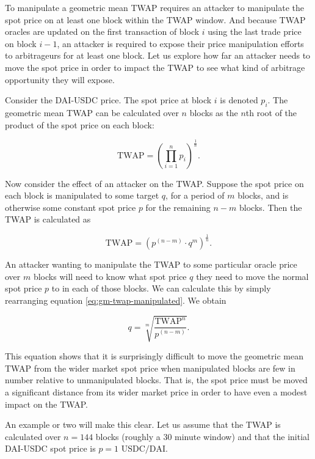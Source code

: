 \documentclass[a4paper, 11pt]{article}
\begin{document}
To manipulate a geometric mean TWAP requires an attacker to manipulate the spot price on at least one block within the TWAP window. And because TWAP oracles are updated on the first transaction of block $i$ using the last trade price on block $i - 1$, an attacker is required to expose their price manipulation efforts to arbitrageurs for at least one block. Let us explore how far an attacker needs to move the spot price in order to impact the TWAP to see what kind of arbitrage opportunity they will expose. 

Consider the DAI-USDC price. The spot price at block $i$ is denoted $p_i$. The geometric mean TWAP can be calculated over $n$ blocks as the $n$th root of the product of the spot price on each block:

\begin{equation}
\text{TWAP}
=
\left( \prod_{i=1}^n p_i \right)^{\frac{1}{n}}.
\end{equation}

Now consider the effect of an attacker on the TWAP. Suppose the spot price on each block is manipulated to some target $q$, for a period of $m$ blocks, and is otherwise some constant spot price $p$ for the remaining $n - m$ blocks. Then the TWAP is calculated as

\begin{equation}
\label{eq:gm-twap-manipulated}
\text{TWAP}
=
\left( p^{(n-m)} \cdot q^m \right)^{\frac{1}{n}}.
\end{equation}

An attacker wanting to manipulate the TWAP to some particular oracle price over $m$ blocks will need to know what spot price $q$ they need to move the normal spot price $p$ to in each of those blocks. We can calculate this by simply rearranging equation \eqref{eq:gm-twap-manipulated}. We obtain

\begin{equation}
\label{eq:gm-spot-manipulated}
q
=
\sqrt[m]{\frac{\text{TWAP}^n}{p^{(n-m)}}}.
\end{equation}

This equation shows that it is surprisingly difficult to move the geometric mean TWAP from the wider market spot price when manipulated blocks are few in number relative to unmanipulated blocks. That is, the spot price must be moved a significant distance from its wider market price in order to have even a modest impact on the TWAP. 

An example or two will make this clear. Let us assume that the TWAP is calculated over $n = 144$ blocks (roughly a 30 minute window) and that the initial DAI-USDC spot price is $p = 1 \text{ USDC} / \text{DAI}$. 
\end{document}
